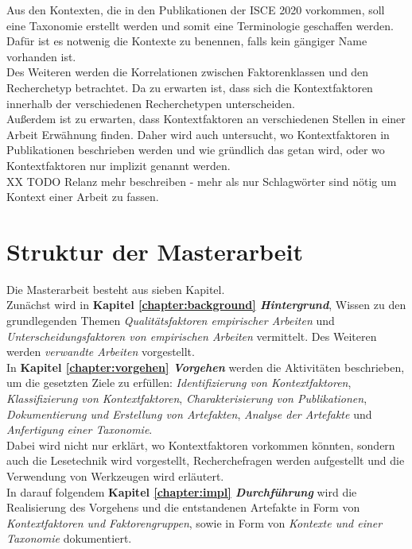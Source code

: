 Aus den Kontexten, die in den Publikationen der ISCE 2020 vorkommen, soll eine Taxonomie erstellt werden und somit eine Terminologie geschaffen werden. Dafür ist es notwenig die Kontexte zu benennen, falls kein gängiger Name vorhanden ist. \\

Des Weiteren werden die Korrelationen zwischen Faktorenklassen und den Recherchetyp betrachtet. Da zu erwarten ist, dass sich die Kontextfaktoren innerhalb der verschiedenen Recherchetypen unterscheiden. \\
Außerdem ist zu erwarten, dass Kontextfaktoren an verschiedenen Stellen in einer Arbeit Erwähnung finden. Daher wird auch untersucht, wo Kontextfaktoren in Publikationen beschrieben werden und wie gründlich das getan wird, oder wo Kontextfaktoren nur implizit genannt werden. \\


XX TODO Relanz mehr beschreiben - mehr als nur Schlagwörter sind nötig um Kontext einer Arbeit zu fassen. \\

\section{Struktur der Masterarbeit}
Die Masterarbeit besteht aus sieben Kapitel. \\

Zunächst wird in \textbf{Kapitel \ref{chapter:background} \textit{Hintergrund}}, Wissen zu den grundlegenden Themen \textit{Qualitätsfaktoren empirischer Arbeiten} und \textit{Unterscheidungsfaktoren von empirischen Arbeiten} vermittelt. Des Weiteren werden \textit{verwandte Arbeiten} vorgestellt. \\

In \textbf{Kapitel \ref{chapter:vorgehen} \textit{Vorgehen}} werden die Aktivitäten beschrieben, um die gesetzten Ziele zu erfüllen: \textit{Identifizierung von Kontextfaktoren}, \textit{Klassifizierung von Kontextfaktoren}, \textit{Charakterisierung von Publikationen}, \textit{Dokumentierung und Erstellung von Artefakten}, \textit{Analyse der Artefakte} und \textit{Anfertigung einer Taxonomie}. \\
Dabei wird nicht nur erklärt, wo Kontextfaktoren vorkommen könnten, sondern auch die Lesetechnik wird vorgestellt, Recherchefragen werden aufgestellt und die Verwendung von Werkzeugen wird erläutert. \\

In darauf folgendem \textbf{Kapitel \ref{chapter:impl} \textit{Durchführung}} wird die Realisierung des Vorgehens und die entstandenen Artefakte in Form von \textit{Kontextfaktoren und Faktorengruppen}, sowie in Form von \textit{Kontexte und einer Taxonomie} dokumentiert. \\

